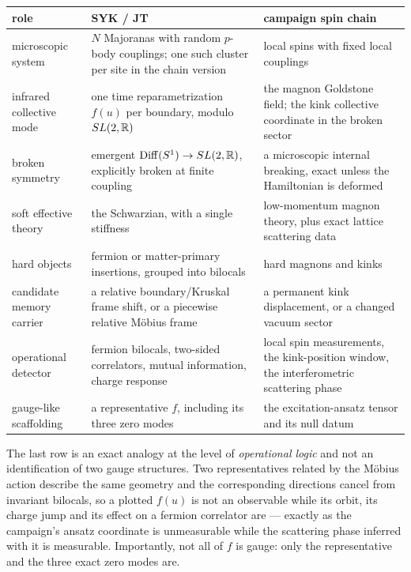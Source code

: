 \begin{center}
{\small
\begin{tabular}{@{}p{}p{}p{}@{}}
\toprule
\textbf{role} & \textbf{SYK / JT} & \textbf{campaign spin chain} \\
\midrule
microscopic system &
$N$ Majoranas with random $p$-body couplings; one such cluster per site in the
chain version &
local spins with fixed local couplings \\
infrared collective mode &
one time reparametrization $f(u)$ per boundary, modulo $SL(2,\mathbb{R})$ &
the magnon Goldstone field; the kink collective coordinate in the broken
sector \\
broken symmetry &
emergent $\operatorname{Diff}(S^1)\to SL(2,\mathbb{R})$, explicitly broken at finite coupling &
a microscopic internal breaking, exact unless the Hamiltonian is deformed \\
soft effective theory &
the Schwarzian, with a single stiffness &
low-momentum magnon theory, plus exact lattice scattering data \\
hard objects &
fermion or matter-primary insertions, grouped into bilocals &
hard magnons and kinks \\
candidate memory carrier &
a relative boundary/Kruskal frame shift, or a piecewise relative M\"obius frame
&
a permanent kink displacement, or a changed vacuum sector \\
operational detector &
fermion bilocals, two-sided correlators, mutual information, charge response &
local spin measurements, the kink-position window, the interferometric
scattering phase \\
gauge-like scaffolding &
a representative $f$, including its three zero modes &
the excitation-ansatz tensor and its null datum \\
\bottomrule
\end{tabular}
}
\end{center}

\noindent The last row is an exact analogy at the level of \emph{operational
logic} and not an identification of two gauge structures. Two representatives
related by the M\"obius action describe the same geometry and the corresponding
directions cancel from invariant bilocals, so a plotted $f(u)$ is not an
observable while its orbit, its charge jump and its effect on a fermion
correlator are --- exactly as the campaign's ansatz coordinate is unmeasurable
while the scattering phase inferred with it is measurable. Importantly, not all
of $f$ is gauge: only the representative and the three exact zero modes are.

